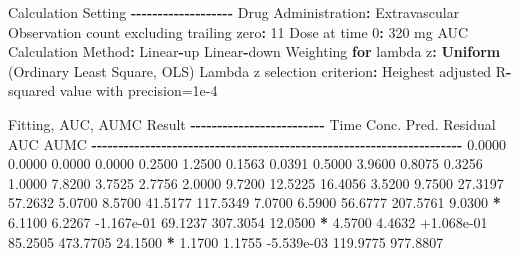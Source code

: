 \documentclass[
  10pt,
]{krantz}
\makeatletter
\newenvironment{Shaded}{\begin{snugshade}}{\end{snugshade}}
\newcommand{\ControlFlowTok}[1]{\textcolor[rgb]{0.13,0.29,0.53}{\textbf{#1}}}
\newcommand{\DecValTok}[1]{\textcolor[rgb]{0.00,0.00,0.81}{#1}}
\newcommand{\FloatTok}[1]{\textcolor[rgb]{0.00,0.00,0.81}{#1}}
\newcommand{\KeywordTok}[1]{\textcolor[rgb]{0.13,0.29,0.53}{\textbf{#1}}}
\newcommand{\NormalTok}[1]{#1}
\newcommand{\OperatorTok}[1]{\textcolor[rgb]{0.81,0.36,0.00}{\textbf{#1}}}
\newcommand{\StringTok}[1]{\textcolor[rgb]{0.31,0.60,0.02}{#1}}
\newenvironment{kframe}{%
\medskip{}
\setlength{\fboxsep}{.8em}
 \def\at@end@of@kframe{}%
 \ifinner\ifhmode%
  \def\at@end@of@kframe{\end{minipage}}%
  \begin{minipage}{\columnwidth}%
 \fi\fi%
 \def\FrameCommand##1{\hskip\@totalleftmargin \hskip-\fboxsep
 \colorbox{shadecolor}{##1}\hskip-\fboxsep
     \hskip-\linewidth \hskip-\@totalleftmargin \hskip\columnwidth}%
 \MakeFramed {\advance\hsize-\width
   \@totalleftmargin\z@ \linewidth\hsize
   \@setminipage}}%
 {\par\unskip\endMakeFramed%
 \at@end@of@kframe}
\renewenvironment{Shaded}{\begin{kframe}}{\end{kframe}}
\makeatother
\begin{document}
\begin{Shaded}
\begin{Highlighting}[]
\NormalTok{Calculation Setting}
\OperatorTok{{-}{-}{-}{-}{-}{-}{-}{-}{-}{-}{-}{-}{-}{-}{-}{-}{-}{-}{-}}
\NormalTok{Drug Administration}\OperatorTok{:}\StringTok{ }\NormalTok{Extravascular}
\NormalTok{Observation count excluding trailing zero}\OperatorTok{:}\StringTok{ }\DecValTok{11}
\NormalTok{Dose at time }\DecValTok{0}\OperatorTok{:}\StringTok{ }\DecValTok{320}\NormalTok{ mg}
\NormalTok{AUC Calculation Method}\OperatorTok{:}\StringTok{ }\NormalTok{Linear}\OperatorTok{{-}}\NormalTok{up Linear}\OperatorTok{{-}}\NormalTok{down}
\NormalTok{Weighting }\ControlFlowTok{for}\NormalTok{ lambda z}\OperatorTok{:}\StringTok{ }\KeywordTok{Uniform}\NormalTok{ (Ordinary Least Square, OLS)}
\NormalTok{Lambda z selection criterion}\OperatorTok{:}\StringTok{ }\NormalTok{Heighest adjusted R}\OperatorTok{{-}}\NormalTok{squared value with precision=}\FloatTok{1e{-}4}


\NormalTok{Fitting, AUC, AUMC Result}
\OperatorTok{{-}{-}{-}{-}{-}{-}{-}{-}{-}{-}{-}{-}{-}{-}{-}{-}{-}{-}{-}{-}{-}{-}{-}{-}{-}}
\StringTok{      }\NormalTok{Time         Conc.      Pred.   Residual       AUC       AUMC}
\OperatorTok{{-}{-}{-}{-}{-}{-}{-}{-}{-}{-}{-}{-}{-}{-}{-}{-}{-}{-}{-}{-}{-}{-}{-}{-}{-}{-}{-}{-}{-}{-}{-}{-}{-}{-}{-}{-}{-}{-}{-}{-}{-}{-}{-}{-}{-}{-}{-}{-}{-}{-}{-}{-}{-}{-}{-}{-}{-}{-}{-}{-}{-}{-}{-}{-}{-}{-}{-}{-}{-}}
\StringTok{     }\FloatTok{0.0000}       \FloatTok{0.0000}                           \FloatTok{0.0000}     \FloatTok{0.0000}
     \FloatTok{0.2500}       \FloatTok{1.2500}                           \FloatTok{0.1563}     \FloatTok{0.0391}
     \FloatTok{0.5000}       \FloatTok{3.9600}                           \FloatTok{0.8075}     \FloatTok{0.3256}
     \FloatTok{1.0000}       \FloatTok{7.8200}                           \FloatTok{3.7525}     \FloatTok{2.7756}
     \FloatTok{2.0000}       \FloatTok{9.7200}                          \FloatTok{12.5225}    \FloatTok{16.4056}
     \FloatTok{3.5200}       \FloatTok{9.7500}                          \FloatTok{27.3197}    \FloatTok{57.2632}
     \FloatTok{5.0700}       \FloatTok{8.5700}                          \FloatTok{41.5177}   \FloatTok{117.5349}
     \FloatTok{7.0700}       \FloatTok{6.5900}                          \FloatTok{56.6777}   \FloatTok{207.5761}
     \FloatTok{9.0300} \OperatorTok{*}\StringTok{     }\FloatTok{6.1100}     \FloatTok{6.2267} \FloatTok{{-}1.167e{-}01}    \FloatTok{69.1237}   \FloatTok{307.3054}
    \FloatTok{12.0500} \OperatorTok{*}\StringTok{     }\FloatTok{4.5700}     \FloatTok{4.4632} \FloatTok{+1.068e{-}01}    \FloatTok{85.2505}   \FloatTok{473.7705}
    \FloatTok{24.1500} \OperatorTok{*}\StringTok{     }\FloatTok{1.1700}     \FloatTok{1.1755} \FloatTok{{-}5.539e{-}03}   \FloatTok{119.9775}   \FloatTok{977.8807}


\end{Highlighting}
\end{Shaded}
\end{document}
